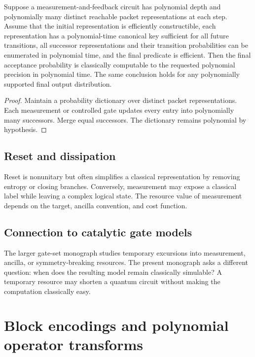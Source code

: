 \begin{proposition}
Suppose a measurement-and-feedback circuit has polynomial depth and polynomially many distinct reachable packet representations at each step. Assume that the initial representation is efficiently constructible, each representation has a polynomial-time canonical key sufficient for all future transitions, all successor representations and their transition probabilities can be enumerated in polynomial time, and the final predicate is efficient. Then the final acceptance probability is classically computable to the requested polynomial precision in polynomial time. The same conclusion holds for any polynomially supported final output distribution.
\end{proposition}

\begin{proof}
Maintain a probability dictionary over distinct packet representations. Each measurement or controlled gate updates every entry into polynomially many successors. Merge equal successors. The dictionary remains polynomial by hypothesis.
\end{proof}

\subsection{Reset and dissipation}
Reset is nonunitary but often simplifies a classical representation by removing entropy or closing branches. Conversely, measurement may expose a classical label while leaving a complex logical state. The resource value of measurement depends on the target, ancilla convention, and cost function.

\subsection{Connection to catalytic gate models}
The larger gate-set monograph studies temporary excursions into measurement, ancilla, or symmetry-breaking resources. The present monograph asks a different question: when does the resulting model remain classically simulable? A temporary resource may shorten a quantum circuit without making the computation classically easy.

\section{Block encodings and polynomial operator transforms}
\label{s:ch:block-encodings}

